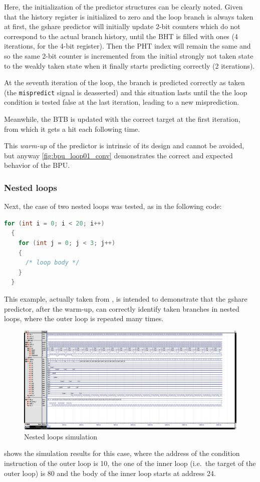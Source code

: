 Here, the initialization of the predictor structures can be clearly noted. Given that the history register is initialized to zero and the loop branch is always taken at first, the gshare predictor will initially update 2-bit counters which do not correspond to the actual branch history, until the \ac{BHT} is filled with ones (4 iterations, for the 4-bit register). Then the \ac{PHT} index will remain the same and so the same 2-bit counter is incremented from the initial strongly not taken state to the weakly taken state when it finally starts predicting correctly (2 iterations).

At the seventh iteration of the loop, the branch is predicted correctly as taken (the \texttt{mispredict} signal is deasserted) and this situation lasts until the the loop condition is tested false at the last iteration, leading to a new misprediction. 

Meanwhile, the \ac{BTB} is updated with the correct target at the first iteration, from which it gets a hit each following time.

This \emph{warm-up} of the predictor is intrinsic of its design and cannot be avoided, but anyway \cref{fig:bpu_loop01_conv} demonstrates the correct and expected behavior of the \ac{BPU}.

\subsubsection{Nested loops}
Next, the case of two nested loops was tested, as in the following code:
\begin{lstlisting}[language=C]
  for (int i = 0; i < 20; i++)
  {
    for (int j = 0; j < 3; j++)
    {
      /* loop body */
    }
  }
\end{lstlisting}
This example, actually taken from \cite{mcfarling93}, is intended to demonstrate that the gshare predictor, after the warm-up, can correctly identify taken branches in nested loops, where the outer loop is repeated many times.

\begin{figure}
  \centering
  \includegraphics[width=\textheight]{img/bpu_loop02_conv.png}
  \caption{Nested loops simulation}
  \label{fig:bpu_loop02_conv}
\end{figure}
 shows the simulation results for this case, where the address of the condition instruction of the outer loop is 10, the one of the inner loop (i.e.\ the target of the outer loop) is 80 and the body of the inner loop starts at address 24. 

